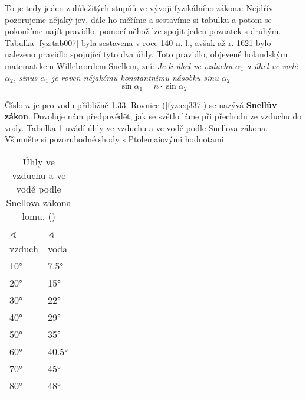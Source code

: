     To je tedy jeden z důležitých stupňů ve vývoji fyzikálního zákona: Nejdřív pozorujeme nějaký 
    jev, dále ho měříme a sestavíme si tabulku a potom se pokoušíme najít pravidlo, pomocí něhož
    lze spojit jeden poznatek s druhým. Tabulka \ref{fyz:tab007} byla sestavena v roce 140 n. l., 
    avšak až r. 1621 bylo nalezeno pravidlo spojující tyto dva úhly. Toto pravidlo, objevené 
    holandským matematikem Willebrordem Snellem, zní: \emph{Je-li úhel ve vzduchu \(\alpha_1\) a 
    úhel ve vodě \(\alpha_2\), sinus \(\alpha_1\) je roven néjakému konstantnímu násobku sinu 
    \(\alpha_2\)}
    \begin{equation}\label{fyz:eq337}
      \sin\alpha_1 = n\cdot\sin\alpha_2
    \end{equation}
    
    Číslo \(n\) je pro vodu přibližně \num{1.33}. Rovnice (\ref{fyz:eq337}) se nazývá 
    \textbf{Snellův zákon}. Dovoluje nám předpovědět, jak se světlo láme při přechodu ze vzduchu do 
    vody. Tabulka \ref{fyz:tab008} uvádí úhly ve vzduchu a ve vodě podle Snellova zákona. Všimněte 
    si pozoruhodné shody s Ptolemaiovými hodnotami.

    \begin{table}[ht!]     %
      \centering
      \renewcommand{\arraystretch}{1.0}
      \begin{tabular}{>{\centering\arraybackslash}p{3em}|>{\centering\arraybackslash}p{3em}}
         \hline \(\sphericalangle\) & \(\sphericalangle\)     \\
                    vzduch & voda         \\
         \hline   \ang{10} & \ang{7.5}    \\
                  \ang{20} & \ang{15}     \\
                  \ang{30} & \ang{22}     \\
                  \ang{40} & \ang{29}     \\
                  \ang{50} & \ang{35}     \\
                  \ang{60} & \ang{40.5}   \\
                  \ang{70} & \ang{45}     \\
                  \ang{80} & \ang{48}     \\
         \hline 
      \end{tabular}
      \caption{Úhly ve vzduchu a ve vodě podle Snellova zákona lomu.
               (\cite[s.~347]{Feynman01})}
      \label{fyz:tab008}
    \end{table}
    
